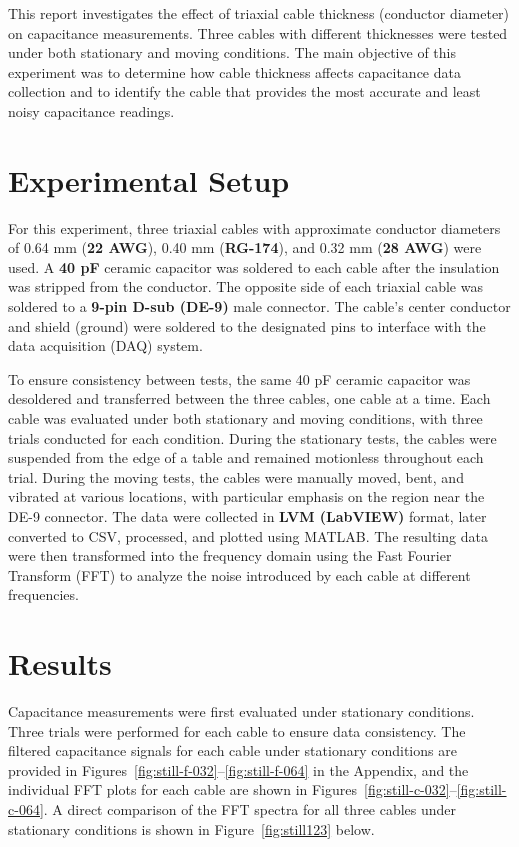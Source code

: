 \documentclass[11pt]{article}
\begin{document}
	This report investigates the effect of triaxial cable thickness (conductor diameter) on capacitance measurements. Three cables with different thicknesses were tested under both stationary and moving conditions. The main objective of this experiment was to determine how cable thickness affects capacitance data collection and to identify the cable that provides the most accurate and least noisy capacitance readings.
	
	\section{Experimental Setup}
	
	For this experiment, three triaxial cables with approximate conductor diameters of 0.64 mm (\textbf{22 AWG}), 0.40 mm (\textbf{RG-174}), and 0.32 mm (\textbf{28 AWG}) were used. A \textbf{40 pF} ceramic capacitor was soldered to each cable after the insulation was stripped from the conductor. The opposite side of each triaxial cable was soldered to a \textbf{9-pin D-sub (DE-9)} male connector. The cable's center conductor and shield (ground) were soldered to the designated pins to interface with the data acquisition (DAQ) system.
	
	To ensure consistency between tests, the same 40 pF ceramic capacitor was desoldered and transferred between the three cables, one cable at a time. Each cable was evaluated under both stationary and moving conditions, with three trials conducted for each condition. During the stationary tests, the cables were suspended from the edge of a table and remained motionless throughout each trial. During the moving tests, the cables were manually moved, bent, and vibrated at various locations, with particular emphasis on the region near the DE-9 connector. The data were collected in \textbf{LVM (LabVIEW)} format, later converted to CSV, processed, and plotted using MATLAB. The resulting data were then transformed into the frequency domain using the Fast Fourier Transform (FFT) to analyze the noise introduced by each cable at different frequencies.
	
	\section{Results}
	
	Capacitance measurements were first evaluated under stationary conditions. Three trials were performed for each cable to ensure data consistency. The filtered capacitance signals for each cable under stationary conditions are provided in Figures~\ref{fig:still-f-032}--\ref{fig:still-f-064} in the Appendix, and the individual FFT plots for each cable are shown in Figures~\ref{fig:still-c-032}--\ref{fig:still-c-064}. A direct comparison of the FFT spectra for all three cables under stationary conditions is shown in Figure~\ref{fig:still123} below.
	
\end{document}
